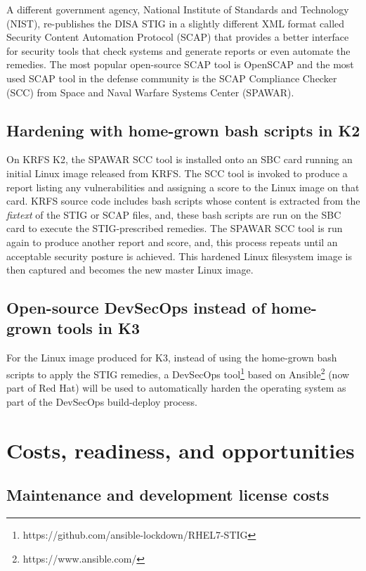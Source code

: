 \documentclass[12pt]{article}
\begin{document}
A different government agency, National Institute of Standards and Technology
(NIST), re-publishes the DISA STIG in a slightly different XML format called
Security Content Automation Protocol (SCAP) that provides a better interface for
security tools that check systems and generate reports or even automate the
remedies.  The most popular open-source SCAP tool is OpenSCAP and the most used
SCAP tool in the defense community is the SCAP Compliance Checker (SCC) from
Space and Naval Warfare Systems Center (SPAWAR).

\subsection{Hardening with home-grown bash scripts in K2}
On KRFS K2, the SPAWAR SCC tool is installed onto an SBC card running an initial
Linux image released from KRFS.  The SCC tool is invoked to produce a report
listing any vulnerabilities and assigning a score to the Linux image on that
card.  KRFS source code includes bash scripts whose content is extracted from
the \emph{fixtext} of the STIG or SCAP files, and, these bash scripts are run on
the SBC card to execute the STIG-prescribed remedies.  The SPAWAR SCC tool is
run again to produce another report and score, and, this process repeats until
an acceptable security posture is achieved.  This hardened Linux filesystem
image is then captured and becomes the new master Linux image.

\subsection{Open-source DevSecOps instead of home-grown tools in K3}
For the Linux image produced for K3, instead of using the home-grown bash
scripts to apply the STIG remedies, a DevSecOps
tool\footnote{https://github.com/ansible-lockdown/RHEL7-STIG} based on
Ansible\footnote{https://www.ansible.com/} (now part of Red Hat) will be used to
automatically harden the operating system as part of the DevSecOps build-deploy
process.

%
\newpage
\section{Costs, readiness, and opportunities}
\label{sec:costs_opportunities}


\subsection{Maintenance and development license costs}
\end{document}
